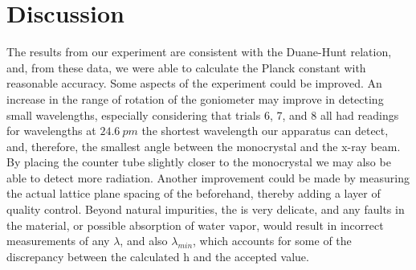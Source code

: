 \documentclass[aps,prl,preprint,groupedaddress]{revtex4-2}
\begin{document}
\section{Discussion}
The results from our experiment are consistent with the Duane-Hunt relation, and, from these data, we were able to calculate the Planck constant with reasonable accuracy. Some aspects of the experiment could be improved. An increase in the range of rotation of the goniometer may improve in detecting small wavelengths, especially considering that trials 6, 7, and 8 all had readings for wavelengths at $24.6~\si{pm}$ the shortest wavelength our apparatus can detect, and, therefore, the smallest angle between the monocrystal and the x-ray beam. By placing the counter tube slightly closer to the monocrystal we may also be able to detect more radiation. Another improvement could be made by measuring the actual lattice plane spacing of the  beforehand, thereby adding a layer of quality control. Beyond natural impurities, the  is very delicate, and any faults in the material, or possible absorption of water vapor, would result in incorrect measurements of any $\lambda$, and also $\lambda_{min}$, which accounts for some of the discrepancy between the calculated h and the accepted value.

\end{document}
